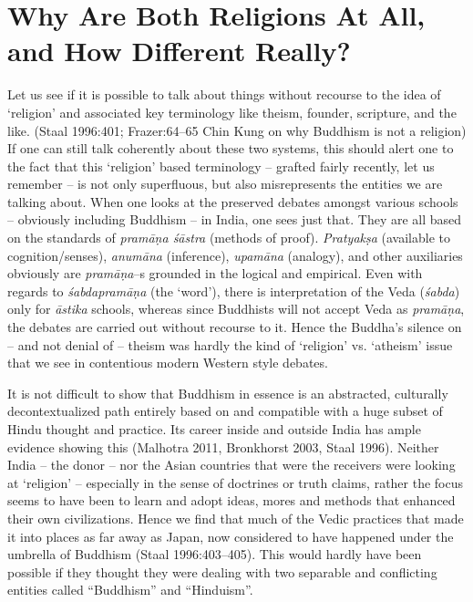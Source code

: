 \section*{Why Are Both Religions At All, and How Different Really?}

Let us see if it is possible to talk about things without recourse to the idea of ‘religion’ and associated key terminology like theism, founder, scripture, and the like. (Staal 1996:401; Frazer:64–65 Chin Kung on why Buddhism is not a religion) If one can still talk coherently about these two systems, this should alert one to the fact that this ‘religion’ based terminology – grafted fairly recently, let us remember – is not only superfluous, but also misrepresents the entities we are talking about. When one looks at the preserved debates amongst various schools – obviously including Buddhism – in India, one sees just that. They are all based on the standards of \textit{pramāṇa śāstra} (methods of proof). \textit{Pratyakṣa} (available to cognition/senses), \textit{anumāna} (inference), \textit{upamāna} (analogy), and other auxiliaries obviously are \textit{pramāṇa}–s grounded in the logical and empirical. Even with regards to \textit{śabdapramāṇa} (the ‘word’), there is interpretation of the Veda (\textit{śabda}) only for \textit{āstika} schools, whereas since Buddhists will not accept Veda as \textit{pramāṇa}, the debates are carried out without recourse to it. Hence the Buddha’s silence on – and not denial of – theism was hardly the kind of ‘religion’ vs. ‘atheism’ issue that we see in contentious modern Western style debates.

It is not difficult to show that Buddhism in essence is an abstracted, culturally decontextualized path entirely based on and compatible with a huge subset of Hindu thought and practice. Its career inside and outside India has ample evidence showing this (Malhotra 2011, Bronkhorst 2003, Staal 1996). Neither India – the donor – nor the Asian countries that were the receivers were looking at ‘religion’ – especially in the sense of doctrines or truth claims, rather the focus seems to have been to learn and adopt ideas, mores and methods that enhanced their own civilizations. Hence we find that much of the Vedic practices that made it into places as far away as Japan, now considered to have happened under the umbrella of Buddhism (Staal 1996:403–405). This would hardly have been possible if they thought they were dealing with two separable and conflicting entities called “Buddhism” and “Hinduism”.


